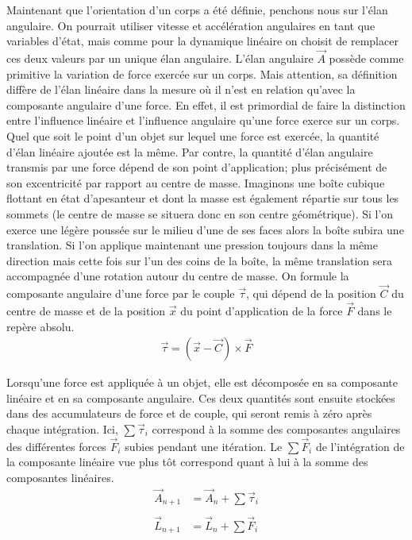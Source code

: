 Maintenant que l'orientation d'un corps a été définie, penchons nous
sur l'élan angulaire. On pourrait utiliser vitesse et accélération
angulaires en tant que variables d'état, mais comme pour la dynamique
linéaire on choisit de remplacer ces deux valeurs par un unique élan
angulaire. L'élan angulaire $\vec A$ possède comme primitive la
variation de force exercée sur un corps. Mais attention, sa définition
diffère de l'élan linéaire dans la mesure o\`u il n'est en relation
qu'avec la composante angulaire d'une force. En effet, il est
primordial de faire la distinction entre l'influence linéaire et
l'influence angulaire qu'une force exerce sur un corps. Quel que soit
le point d'un objet sur lequel une force est exercée, la quantité
d'élan linéaire ajoutée est la même. Par contre, la quantité d'élan
angulaire transmis par une force dépend de son point d'application;
plus précisément de son excentricité par rapport au centre de
masse. Imaginons une boîte cubique flottant en état d'apesanteur et
dont la masse est également répartie sur tous les sommets (le centre
de masse se situera donc en son centre géométrique). Si l'on exerce
une légère poussée sur le milieu d'une de ses faces alors la boîte
subira une translation. Si l'on applique maintenant une pression
toujours dans la même direction mais cette fois sur l'un des coins de
la boîte, la même translation sera accompagnée d'une rotation autour
du centre de masse. On formule la composante angulaire d'une force par
le couple $\vec{\tau}$, qui dépend de la position $\vec C$ du centre
de masse et de la position $\vec x$ du point d'application de la force
$\vec{F}$ dans le repère absolu.
\begin{align*}
  \vec{\tau} = (\vec{x} - \vec{C}) \times \vec{F}
\end{align*}

Lorsqu'une force est appliquée à un objet, elle est décomposée en sa
composante linéaire et en sa composante angulaire. Ces deux quantités
sont ensuite stockées dans des accumulateurs de force et de couple,
qui seront remis à zéro après chaque intégration. Ici, $\sum
\vec{\tau}_i$ correspond à la somme des composantes angulaires des
différentes forces $\vec{F}_i$ subies pendant une itération. Le $\sum
\vec{F}_i$ de l'intégration de la composante linéaire vue plus tôt
correspond quant à lui à la somme des composantes linéaires.
\begin{align*}
  \vec{A}_{n+1} &= \vec{A}_n + {\sum \vec{\tau}_i} \\ \\
  \vec{L}_{n+1} &= \vec{L}_n + {\sum \vec{F}_i}
\end{align*}

